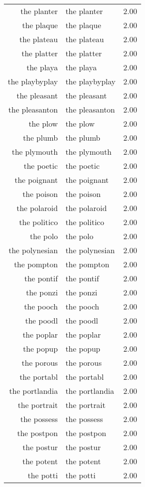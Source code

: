 \begin{table}[ht]
\begin{tabular}{rlr}
  the planter & the planter & 2.00 \\ 
  the plaque & the plaque & 2.00 \\ 
  the plateau & the plateau & 2.00 \\ 
  the platter & the platter & 2.00 \\ 
  the playa & the playa & 2.00 \\ 
  the playbyplay & the playbyplay & 2.00 \\ 
  the pleasant & the pleasant & 2.00 \\ 
  the pleasanton & the pleasanton & 2.00 \\ 
  the plow & the plow & 2.00 \\ 
  the plumb & the plumb & 2.00 \\ 
  the plymouth & the plymouth & 2.00 \\ 
  the poetic & the poetic & 2.00 \\ 
  the poignant & the poignant & 2.00 \\ 
  the poison & the poison & 2.00 \\ 
  the polaroid & the polaroid & 2.00 \\ 
  the politico & the politico & 2.00 \\ 
  the polo & the polo & 2.00 \\ 
  the polynesian & the polynesian & 2.00 \\ 
  the pompton & the pompton & 2.00 \\ 
  the pontif & the pontif & 2.00 \\ 
  the ponzi & the ponzi & 2.00 \\ 
  the pooch & the pooch & 2.00 \\ 
  the poodl & the poodl & 2.00 \\ 
  the poplar & the poplar & 2.00 \\ 
  the popup & the popup & 2.00 \\ 
  the porous & the porous & 2.00 \\ 
  the portabl & the portabl & 2.00 \\ 
  the portlandia & the portlandia & 2.00 \\ 
  the portrait & the portrait & 2.00 \\ 
  the possess & the possess & 2.00 \\ 
  the postpon & the postpon & 2.00 \\ 
  the postur & the postur & 2.00 \\ 
  the potent & the potent & 2.00 \\ 
  the potti & the potti & 2.00 \\ 

\end{tabular}
\end{table}
